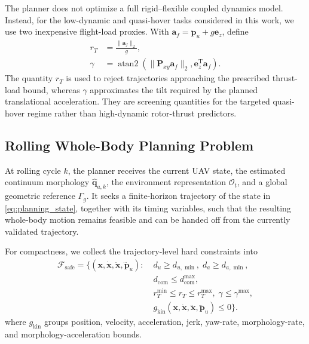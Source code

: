 \documentclass[journal,twoside]{IEEEtran}
\begin{document}
The planner does not optimize a full rigid--flexible coupled dynamics model. Instead, for the low-dynamic and quasi-hover tasks considered in this work, we use two inexpensive flight-load proxies. With
$\mathbf a_f=\ddot{\mathbf p}_u+g\mathbf e_z$, define
\begin{equation}
\begin{aligned}
 r_T&=\frac{\|\mathbf a_f\|_2}{g},\\
 \gamma&=\operatorname{atan2}\!\left(
 \|\mathbf P_{xy}\mathbf a_f\|_2,
 \mathbf e_z^{\mathrm T}\mathbf a_f\right).
\end{aligned}
\label{eq:flight_proxy}
\end{equation}
The quantity $r_T$ is used to reject trajectories approaching the prescribed thrust-load bound, whereas $\gamma$ approximates the tilt required by the planned translational acceleration. They are screening quantities for the targeted quasi-hover regime rather than high-dynamic rotor-thrust predictors.

\subsection{Rolling Whole-Body Planning Problem}
At rolling cycle $k$, the planner receives the current UAV state, the estimated continuum morphology $\hat{\mathbf q}_{a,k}$, the environment representation $\mathcal O_t$, and a global geometric reference $\Gamma_g$. It seeks a finite-horizon trajectory of the state in \eqref{eq:planning_state}, together with its timing variables, such that the resulting whole-body motion remains feasible and can be handed off from the currently validated trajectory.

For compactness, we collect the trajectory-level hard constraints into
\begin{equation}
\begin{aligned}
\mathcal F_{\mathrm{safe}}=\{(\mathbf x,\dot{\mathbf x},\ddot{\mathbf x},\dddot{\mathbf p}_u):\;&
 d_u\ge d_{u,\min},\; d_a\ge d_{a,\min},\\
& d_{\mathrm{com}}\le d_{\mathrm{com}}^{\max},\\
& r_T^{\min}\le r_T\le r_T^{\max},\;
 \gamma\le\gamma^{\max},\\
& g_{\mathrm{kin}}(\mathbf x,\dot{\mathbf x},\ddot{\mathbf x},\dddot{\mathbf p}_u)\le0\}.
\end{aligned}
\label{eq:safe_set}
\end{equation}
where $g_{\mathrm{kin}}$ groups position, velocity, acceleration, jerk, yaw-rate, morphology-rate, and morphology-acceleration bounds.
\end{document}
